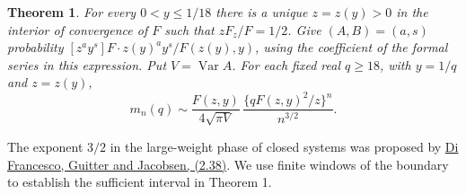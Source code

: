 \documentclass[11pt,letterpaper]{article}
\newcommand{\Var}{\operatorname{Var}}
\newtheorem{theorem}{Theorem}
\begin{document}
\begin{theorem}
For every \(0<y\le1/18\) there is a unique \(z=z(y)>0\) in the
interior of convergence of \(F\) such that \(zF_z/F=1/2\).
Give \((A,B)=(a,s)\) probability
\([z^ay^s]F\cdot z(y)^ay^s/F(z(y),y)\), using the coefficient of
the formal series in this expression. Put \(V=\Var A\). For each
fixed real \(q\ge18\), with \(y=1/q\) and \(z=z(y)\),
\[
 m_n(q)\sim \frac{F(z,y)}{4\sqrt{\pi V}}\,
 \frac{\{qF(z,y)^2/z\}^n}{n^{3/2}} .
 \tag{2}
\]
\end{theorem}
The exponent \(3/2\) in the large-weight phase of closed systems
was proposed by \href{https://arxiv.org/abs/cond-mat/0003008}{Di
Francesco, Guitter and Jacobsen, (2.38)}. We use finite windows of the boundary to establish the sufficient interval in Theorem 1.


\end{document}
